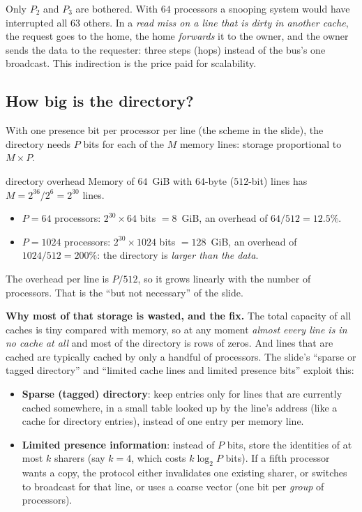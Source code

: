 Only $P_2$ and $P_3$ are bothered. With $64$ processors a snooping system would have interrupted all $63$ others. In
a \emph{read miss on a line that is dirty in another cache}, the request goes to the home, the home \emph{forwards} it to the
owner, and the owner sends the data to the requester: three steps (hops) instead of the bus's one broadcast. This indirection
is the price paid for scalability.

\subsection{How big is the directory?}

With one presence bit per processor per line (the  scheme in the slide), the directory needs
$P$ bits for each of the $M$ memory lines: storage proportional to $M\times P$.

\begin{workedex}{directory overhead}
Memory of $64$~GiB with $64$-byte ($512$-bit) lines has $M = 2^{36}/2^{6} = 2^{30}$ lines.
\begin{itemize}
  \item $P=64$ processors: $2^{30}\times 64$ bits $=8$~GiB, an overhead of $64/512 = 12.5\%$.
  \item $P=1024$ processors: $2^{30}\times 1024$ bits $=128$~GiB, an overhead of $1024/512 = 200\%$: the directory is \emph{larger than the data}.
\end{itemize}
The overhead per line is $P/512$, so it grows linearly with the number of processors. That is the ``but not necessary'' of the slide.
\end{workedex}

\textbf{Why most of that storage is wasted, and the fix.} The total capacity of all caches is tiny compared with memory, so at any moment
\emph{almost every line is in no cache at all} and most of the directory is rows of zeros. And lines that are cached are typically
cached by only a handful of processors. The slide's ``sparse or tagged directory'' and ``limited cache lines and limited presence bits''
exploit this:
\begin{itemize}
  \item \textbf{Sparse (tagged) directory}: keep entries only for lines that are currently cached somewhere, in a small table
        looked up by the line's address (like a cache for directory entries), instead of one entry per memory line.
  \item \textbf{Limited presence information}: instead of $P$ bits, store the identities of at most $k$ sharers (say $k=4$,
        which costs $k\log_2 P$ bits). If a fifth processor wants a copy, the protocol either invalidates one existing sharer, or
        switches to broadcast for that line, or uses a coarse vector (one bit per \emph{group} of processors).
\end{itemize}

